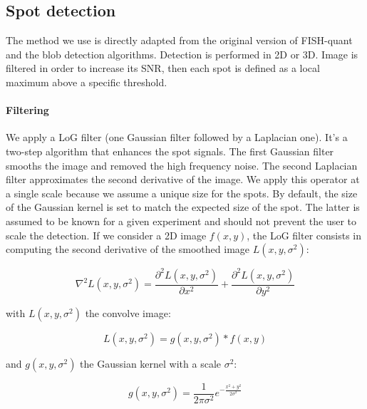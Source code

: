 \subsection{Spot detection} \label{subsec:spot_detection}

The method we use is directly adapted from the original version of FISH-quant\cite{mueller_fish-quant_2013} and the blob detection algorithms\cite{walt_scikit-image_2014}.
Detection is performed in 2D or 3D. Image is filtered in order to increase its \ac{SNR}, then each spot is defined as a local maximum above a specific threshold.

\paragraph{Filtering}

We apply a \ac{LoG} filter (one Gaussian filter followed by a Laplacian one).
It's a two-step algorithm that enhances the spot signals.
The first Gaussian filter smooths the image and removed the high frequency noise.
The second Laplacian filter approximates the second derivative of the image.
We apply this operator at a single scale because we assume a unique size for the spots.
By default, the size of the Gaussian kernel is set to match the expected size of the spot.
The latter is assumed to be known for a given experiment and should not prevent the user to scale the detection.
If we consider a 2D image $f(x,y)$, the \ac{LoG} filter consists in computing the second derivative of the smoothed image $L(x, y, \sigma^2)$:

\begin{equation}
	{\displaystyle \nabla^{2}L(x, y, \sigma^2) = \frac{\partial^{2}L(x, y, \sigma^2)}{\partial x^2} + \frac{\partial^{2}L(x, y, \sigma^2)}{\partial y^2}}
\end{equation}

\noindent
with $L(x, y, \sigma^2)$ the convolve image:

\begin{equation}
	{\displaystyle L(x, y, \sigma^2) = g(x, y, \sigma^2) * f(x, y)}
\end{equation}

\noindent
and $g(x, y, \sigma^2)$ the Gaussian kernel with a scale $\sigma^2$:

\begin{equation}
	{\displaystyle g(x, y, \sigma^2) = \frac{1}{2\pi \sigma^2} e^{-{\frac{x^{2} + y^{2}}{2\sigma^2}}}}
\end{equation}

